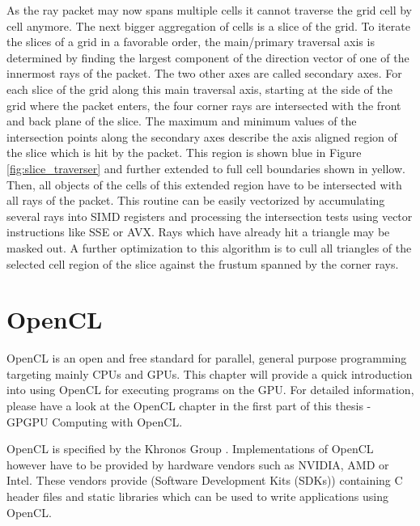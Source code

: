 As the ray packet may now spans multiple cells it cannot traverse the grid cell by cell anymore. The next bigger aggregation of cells is a slice of the grid. To iterate the slices of a grid in a favorable order, the main/primary traversal axis is determined by finding the largest component of the direction vector of one of the innermost rays of the packet. The two other axes are called secondary axes. For each slice of the grid along this main traversal axis, starting at the side of the grid where the packet enters, the four corner rays are intersected with the front and back plane of the slice. The maximum and minimum values of the intersection points along the secondary axes describe the axis aligned region of the slice which is hit by the packet. This region is shown blue in Figure \ref{fig:slice_traverser} and further extended to full cell boundaries shown in yellow. Then, all objects of the cells of this extended region have to be intersected with all rays of the packet. This routine can be easily vectorized by accumulating several rays into SIMD registers and processing the intersection tests using vector instructions like SSE or AVX. Rays which have already hit a triangle may be masked out. A further optimization to this algorithm is to cull all triangles of the selected cell region of the slice against the frustum spanned by the corner rays.


\section{OpenCL}
OpenCL is an open and free standard for parallel, general purpose programming targeting mainly CPUs and GPUs. This chapter will provide a quick introduction into using OpenCL for executing programs on the GPU. For detailed information, please have a look at the OpenCL chapter in the first part of this thesis - GPGPU Computing with OpenCL.

OpenCL is specified by the Khronos Group \cite{opencl_spec}. Implementations of OpenCL however have to be provided by hardware vendors such as NVIDIA, AMD or Intel. These vendors provide (Software Development Kits (SDKs)) containing C header files and static libraries which can be used to write applications using OpenCL.

